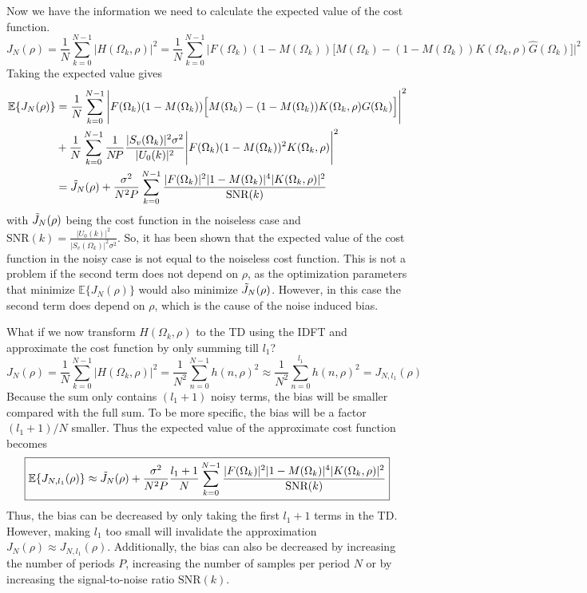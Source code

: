 Now we have the information we need to calculate the expected value of the cost function.
\begin{equation*}
    J_N(\rho) = \frac{1}{N}\sum_{k=0}^{N-1} |H(\Omega_k,\rho)|^2 = \frac{1}{N} \sum_{k=0}^{N-1} \Bigg|F(\Omega_k)(1-M(\Omega_k)) \Big[M(\Omega_k)-(1-M(\Omega_k))K(\Omega_k,\rho) \hat{G}(\Omega_k)\Big]\Bigg|^2
\end{equation*}
Taking the expected value gives
\begin{align*}
    \mathbb{E}\{J_N(\rho)\} &= \frac{1}{N}\sum_{k=0}^{N-1} \Bigg|F(\Omega_k)(1-M(\Omega_k)) \Big[M(\Omega_k)-(1-M(\Omega_k))K(\Omega_k,\rho) G(\Omega_k)\Big]\Bigg|^2 \\
    &+ \frac{1}{N} \sum_{k=0}^{N-1} \frac{1}{N\!P} \frac{|S_v(\Omega_k)|^2 \sigma^2}{|U_0(k)|^2} \Bigg|F(\Omega_k)(1-M(\Omega_k))^2 K(\Omega_k,\rho) \Bigg|^2  \\
    &= \Tilde{J}_N(\rho) + \frac{\sigma^2}{N^2 P} \sum_{k=0}^{N-1} \frac{|F(\Omega_k)|^2|1-M(\Omega_k)|^4 |K(\Omega_k,\rho)|^2}{\text{SNR}(k)}
\end{align*}
with $\Tilde{J}_N(\rho)$ being the cost function in the noiseless case and $\text{SNR}(k) = \frac{|U_0(k)|^2}{|S_v(\Omega_k)|^2 \sigma^2}$. So, it has been shown that the expected value of the cost function in the noisy case is not equal to the noiseless cost function. This is not a problem if the second term does not depend on $\rho$, as the optimization parameters that minimize $\mathbb{E}\{J_N(\rho)\}$ would also minimize $\Tilde{J}_N(\rho)$. However, in this case the second term does depend on $\rho$, which is the cause of the noise induced bias.

What if we now transform $H(\Omega_k,\rho)$ to the TD using the IDFT and approximate the cost function by only summing till $l_1$?
\begin{equation*}
    J_N(\rho) = \frac{1}{N} \sum_{k=0}^{N-1} |H(\Omega_k,\rho)|^2 = \frac{1}{N^2}\sum_{n=0}^{N-1} h(n,\rho)^2 \approx  \frac{1}{N^2}\sum_{n=0}^{l_1} h(n,\rho)^2 = J_{N,l_1}(\rho)
\end{equation*}
Because the sum only contains $(l_1+1)$ noisy terms, the bias will be smaller compared with the full sum. To be more specific, the bias will be a factor $(l_1+1)/N$ smaller. Thus the expected value of the approximate cost function becomes
\begin{equation}
\boxed{
    \mathbb{E}\{J_{N,l_1}(\rho)\} \approx \Tilde{J}_N(\rho) +  \frac{\sigma^2}{N^2 P} \frac{l_1+1}{N} \sum_{k=0}^{N-1} \frac{|F(\Omega_k)|^2|1-M(\Omega_k)|^4 |K(\Omega_k,\rho)|^2}{\text{SNR}(k)}
    }
    \label{eq:EJl1_FD}
\end{equation}
Thus, the bias can be decreased by only taking the first $l_1+1$  terms in the TD. However, making $l_1$ too small will invalidate the approximation $J_N(\rho) \approx J_{N,l_1}(\rho)$. Additionally, the bias can also be decreased by increasing the number of periods $P$, increasing the number of samples per period $N$ or by increasing the signal-to-noise ratio $\textrm{SNR}(k)$.

